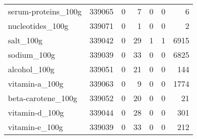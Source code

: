 \begin{tabular}{lrrrrrr}
serum-proteins\_100g                        &                                        339065 &                                         0 &                                             7 &                                         0 &                      0 &                6 \\
nucleotides\_100g                           &                                        339071 &                                         0 &                                             1 &                                         0 &                      0 &                2 \\
salt\_100g                                  &                                        339042 &                                         0 &                                            29 &                                         1 &                      1 &             6915 \\
sodium\_100g                                &                                        339039 &                                         0 &                                            33 &                                         0 &                      0 &             6825 \\
alcohol\_100g                               &                                        339051 &                                         0 &                                            21 &                                         0 &                      0 &              144 \\
vitamin-a\_100g                             &                                        339063 &                                         0 &                                             9 &                                         0 &                      0 &             1774 \\
beta-carotene\_100g                         &                                        339052 &                                         0 &                                            20 &                                         0 &                      0 &               21 \\
vitamin-d\_100g                             &                                        339044 &                                         0 &                                            28 &                                         0 &                      0 &              301 \\
vitamin-e\_100g                             &                                        339039 &                                         0 &                                            33 &                                         0 &                      0 &              212 \\

\end{tabular}
